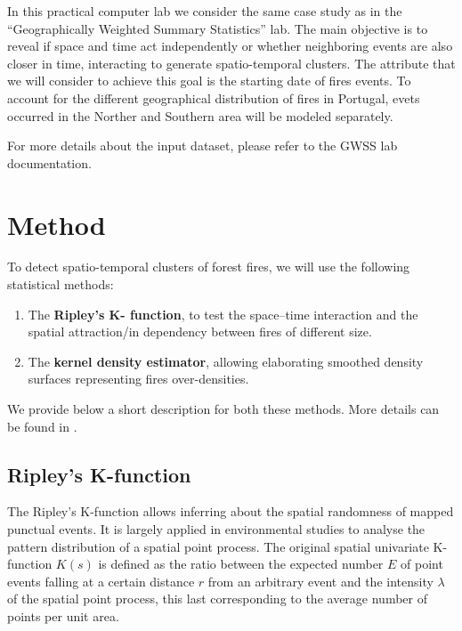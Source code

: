 \documentclass[
]{book}
\begin{document}
In this practical computer lab we consider the same case study as in the ``Geographically Weighted Summary Statistics'' lab.
The main objective is to reveal if space and time act independently or whether neighboring events are also closer in time, interacting to generate spatio-temporal clusters.
The attribute that we will consider to achieve this goal is the starting date of fires events.
To account for the different geographical distribution of fires in Portugal, evets occurred in the Norther and Southern area will be modeled separately.

For more details about the input dataset, please refer to the GWSS lab documentation.

\hypertarget{method}{%
\section{Method}\label{method}}

To detect spatio-temporal clusters of forest fires, we will use the following statistical methods:

\begin{enumerate}
\def\labelenumi{(\arabic{enumi})}
\item
  The \textbf{Ripley's K- function}, to test the space--time interaction and the spatial attraction/in dependency between fires of different size.
\item
  The \textbf{kernel density estimator}, allowing elaborating smoothed density surfaces representing fires over-densities.
\end{enumerate}

We provide below a short description for both these methods.
More details can be found in \citet{tonini_evolution_2017}.

\hypertarget{ripleys-k-function}{%
\subsection{Ripley's K-function}\label{ripleys-k-function}}

The Ripley's K-function allows inferring about the spatial randomness of mapped punctual events.
It is largely applied in environmental studies to analyse the pattern distribution of a spatial point process.
The original spatial univariate K-function \(K(s)\) is defined as the ratio between the expected number \(E\) of point events falling at a certain distance \(r\) from an arbitrary event and the intensity \(\lambda\) of the spatial point process, this last corresponding to the average number of points per unit area.
\end{document}
